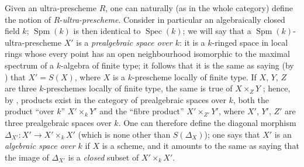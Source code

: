 \begin{env}[10.10.2]
\label{IV.10.10.2}
Given an ultra-prescheme $R$, one can naturally (as in the whole category) define the notion of $R$-\emph{ultra-prescheme}.
Consider in particular an algebraically closed field $k$; $\operatorname{Spm}(k)$ is then identical to $\operatorname{Spec}(k)$; we will say that a $\operatorname{Spm}(k)$-ultra-prescheme $X'$ is a \emph{prealgebraic space over $k$}: it is a $k$-ringed space in local rings whose every point has an open neighbourhood isomorphic to the maximal spectrum of a $k$-algebra of finite type; it follows that it is the same as saying (by ) that $X'=S(X)$, where $X$ is a $k$-prescheme locally of finite type.
If $X$, $Y$, $Z$ are three $k$-preschemes locally of finite type, the same is true of $X\times_ZY$ ; hence, by , products exist in the category of prealgebraic spaces over $k$, both the product ``over $k$'' $X'\times_kY'$ and the ``fibre product'' $X'\times_{Z'}Y'$, where $X'$, $Y'$, $Z'$ are three prealgebraic spaces over $k$.
One can therefore define the diagonal morphism $\Delta_{X'}:X'\to X'\times_k X'$ (which is none other than $S(\Delta_X)$); one says that $X'$ is an \emph{algebraic space over $k$} if $X$ is a scheme, and it amounts to the same as saying that the image of $\Delta_{X'}$ is a \emph{closed} subset of $X'\times_k X'$.
\end{env}

